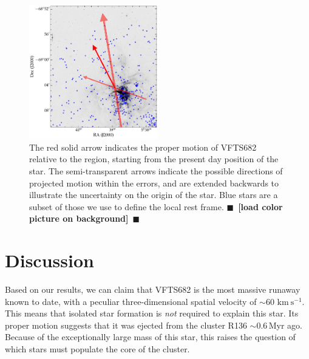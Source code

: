 \documentclass{aa}
\newcommand{\todo}[1]{{\large $\blacksquare$~\textbf{\color{red}[#1]}}~$\blacksquare$}
\newcommand{\kms}{{\,\mathrm{km\ s^{-1}}}}
\begin{document}
{\begin{figure}[htbp]
  \centering
  \includegraphics[width=0.5\textwidth]{./figures/main_plot}  
  \caption{The red solid arrow indicates the proper motion of VFTS682
    relative to the region, starting from the present day position of
    the star. The semi-transparent arrows indicate the possible
    directions of projected motion within the errors, and are extended
    backwards to illustrate the uncertainty on the origin of the
    star. Blue stars
    are a subset of those we use to define the local rest frame. \todo{load color picture on background}}
  \label{fig:main}
\end{figure}

\section{Discussion}
\label{sec:discussion}

Based on our results, we can claim that VFTS682 is the most massive
runaway known to date, with a peculiar three-dimensional spatial
velocity of $\sim$$60\,\kms$. This means that isolated star formation is
\emph{not} required to explain this star. Its proper motion suggests that it was ejected from the cluster R136
$\sim$$0.6$\,Myr ago. Because of the exceptionally large mass
of this star, this raises the question of which stars must populate
the core of the cluster.

}
\end{document}
